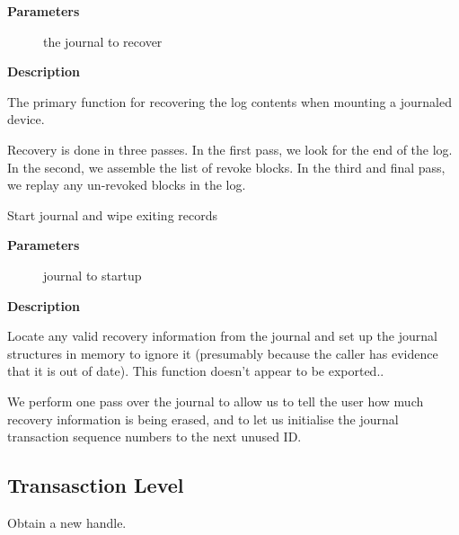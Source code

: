 \documentclass[a4paper,8pt,english]{sphinxmanual}
\begin{document}
\textbf{Parameters}
\begin{description}
\item[{}] \leavevmode
the journal to recover

\end{description}

\textbf{Description}

The primary function for recovering the log contents when mounting a
journaled device.

Recovery is done in three passes.  In the first pass, we look for the
end of the log.  In the second, we assemble the list of revoke
blocks.  In the third and final pass, we replay any un-revoked blocks
in the log.

\begin{fulllineitems}
\label{filesystems/index:c.jbd2_journal_skip_recovery}
Start journal and wipe exiting records

\end{fulllineitems}


\textbf{Parameters}
\begin{description}
\item[{}] \leavevmode
journal to startup

\end{description}

\textbf{Description}

Locate any valid recovery information from the journal and set up the
journal structures in memory to ignore it (presumably because the
caller has evidence that it is out of date).
This function doesn't appear to be exported..

We perform one pass over the journal to allow us to tell the user how
much recovery information is being erased, and to let us initialise
the journal transaction sequence numbers to the next unused ID.


\subsection{Transasction Level}
\label{filesystems/index:transasction-level}

\begin{fulllineitems}
\label{filesystems/index:c.jbd2_journal_start}
Obtain a new handle.

\end{fulllineitems}
\end{document}
